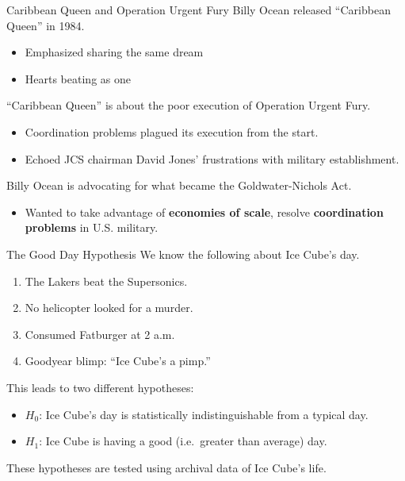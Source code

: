 \documentclass[
  10pt,
  ignorenonframetext,
]{beamer}
\providecommand{\tightlist}{%
  \setlength{\itemsep}{0pt}\setlength{\parskip}{0pt}}
\begin{document}
\begin{frame}{Caribbean Queen and Operation Urgent Fury}
\protect\hypertarget{caribbean-queen-and-operation-urgent-fury}{}
Billy Ocean released ``Caribbean Queen'' in 1984.

\begin{itemize}
\tightlist
\item
  Emphasized sharing the same dream
\item
  Hearts beating as one
\end{itemize}

``Caribbean Queen'' is about the poor execution of Operation Urgent
Fury.

\begin{itemize}
\tightlist
\item
  Coordination problems plagued its execution from the start.
\item
  Echoed JCS chairman David Jones' frustrations with military
  establishment.
\end{itemize}

Billy Ocean is advocating for what became the Goldwater-Nichols Act.

\begin{itemize}
\tightlist
\item
  Wanted to take advantage of \textbf{economies of scale}, resolve
  \textbf{coordination problems} in U.S. military.
\end{itemize}
\end{frame}

\begin{frame}{The Good Day Hypothesis}
\protect\hypertarget{the-good-day-hypothesis}{}
We know the following about Ice Cube's day.

\begin{enumerate}
\tightlist
\item
  The Lakers beat the Supersonics.
\item
  No helicopter looked for a murder.
\item
  Consumed Fatburger at 2 a.m.
\item
  Goodyear blimp: ``Ice Cube's a pimp.''
\end{enumerate}

This leads to two different hypotheses:

\begin{itemize}
\tightlist
\item
  \(H_0\): Ice Cube's day is statistically indistinguishable from a
  typical day.
\item
  \(H_1\): Ice Cube is having a good (i.e.~greater than average) day.
\end{itemize}

These hypotheses are tested using archival data of Ice Cube's life.
\end{frame}
\end{document}
